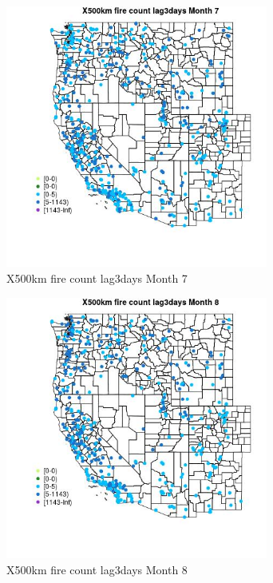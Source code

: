 \begin{figure} 
\centering  
\includegraphics[width=0.77\textwidth]{Code_Outputs/Report_ML_input_PM25_Step4_part_e_de_duplicated_aves_compiled_2019-05-14wNAs_MapObsMo7X500km_fire_count_lag3days.jpg} 
\caption{\label{fig:Report_ML_input_PM25_Step4_part_e_de_duplicated_aves_compiled_2019-05-14wNAsMapObsMo7X500km_fire_count_lag3days}X500km fire count lag3days Month 7} 
\end{figure} 
 

\begin{figure} 
\centering  
\includegraphics[width=0.77\textwidth]{Code_Outputs/Report_ML_input_PM25_Step4_part_e_de_duplicated_aves_compiled_2019-05-14wNAs_MapObsMo8X500km_fire_count_lag3days.jpg} 
\caption{\label{fig:Report_ML_input_PM25_Step4_part_e_de_duplicated_aves_compiled_2019-05-14wNAsMapObsMo8X500km_fire_count_lag3days}X500km fire count lag3days Month 8} 
\end{figure} 
 

